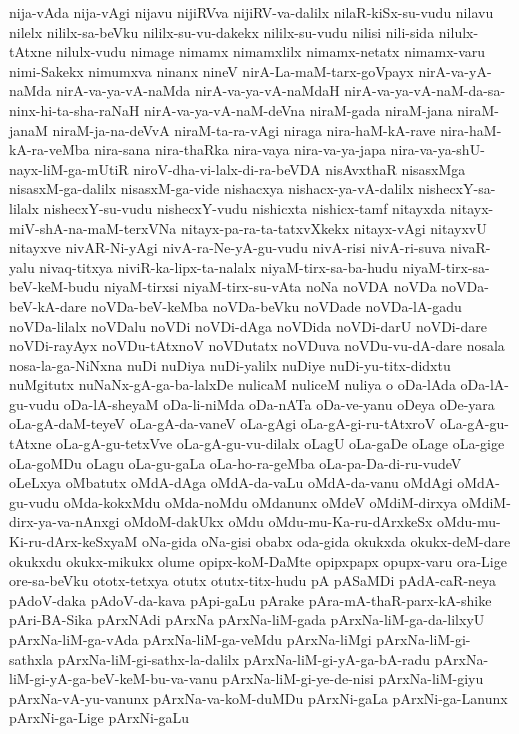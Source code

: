 {nija-vAda
nija-vAgi
nijavu
nijiRVva
nijiRV-va-dalilx
nilaR-kiSx-su-vudu
nilavu
nilelx
nililx-sa-beVku
nililx-su-vu-dakekx
nililx-su-vudu
nilisi
nili-sida
nilulx-tAtxne
nilulx-vudu
nimage
nimamx
nimamxlilx
nimamx-netatx
nimamx-varu
nimi-Sakekx
nimumxva
ninanx
nineV
nirA-La-maM-tarx-goVpayx
nirA-va-yA-naMda
nirA-va-ya-vA-naMda
nirA-va-ya-vA-naMdaH
nirA-va-ya-vA-naM-da-sa-ninx-hi-ta-sha-raNaH
nirA-va-ya-vA-naM-deVna
niraM-gada
niraM-jana
niraM-janaM
niraM-ja-na-deVvA
niraM-ta-ra-vAgi
niraga
nira-haM-kA-rave
nira-haM-kA-ra-veMba
nira-sana
nira-thaRka
nira-vaya
nira-va-ya-japa
nira-va-ya-shU-nayx-liM-ga-mUtiR
niroV-dha-vi-lalx-di-ra-beVDA
nisAvxthaR
nisasxMga
nisasxM-ga-dalilx
nisasxM-ga-vide
nishacxya
nishacx-ya-vA-dalilx
nishecxY-sa-lilalx
nishecxY-su-vudu
nishecxY-vudu
nishicxta
nishicx-tamf
nitayxda
nitayx-miV-shA-na-maM-terxVNa
nitayx-pa-ra-ta-tatxvXkekx
nitayx-vAgi
nitayxvU
nitayxve
nivAR-Ni-yAgi
nivA-ra-Ne-yA-gu-vudu
nivA-risi
nivA-ri-suva
nivaR-yalu
nivaq-titxya
niviR-ka-lipx-ta-nalalx
niyaM-tirx-sa-ba-hudu
niyaM-tirx-sa-beV-keM-budu
niyaM-tirxsi
niyaM-tirx-su-vAta
noNa
noVDA
noVDa
noVDa-beV-kA-dare
noVDa-beV-keMba
noVDa-beVku
noVDade
noVDa-lA-gadu
noVDa-lilalx
noVDalu
noVDi
noVDi-dAga
noVDida
noVDi-darU
noVDi-dare
noVDi-rayAyx
noVDu-tAtxnoV
noVDutatx
noVDuva
noVDu-vu-dA-dare
nosala
nosa-la-ga-NiNxna
nuDi
nuDiya
nuDi-yalilx
nuDiye
nuDi-yu-titx-didxtu
nuMgitutx
nuNaNx-gA-ga-ba-lalxDe
nulicaM
nuliceM
nuliya
o
oDa-lAda
oDa-lA-gu-vudu
oDa-lA-sheyaM
oDa-li-niMda
oDa-nATa
oDa-ve-yanu
oDeya
oDe-yara
oLa-gA-daM-teyeV
oLa-gA-da-vaneV
oLa-gAgi
oLa-gA-gi-ru-tAtxroV
oLa-gA-gu-tAtxne
oLa-gA-gu-tetxVve
oLa-gA-gu-vu-dilalx
oLagU
oLa-gaDe
oLage
oLa-gige
oLa-goMDu
oLagu
oLa-gu-gaLa
oLa-ho-ra-geMba
oLa-pa-Da-di-ru-vudeV
oLeLxya
oMbatutx
oMdA-dAga
oMdA-da-vaLu
oMdA-da-vanu
oMdAgi
oMdA-gu-vudu
oMda-kokxMdu
oMda-noMdu
oMdanunx
oMdeV
oMdiM-dirxya
oMdiM-dirx-ya-va-nAnxgi
oMdoM-dakUkx
oMdu
oMdu-mu-Ka-ru-dArxkeSx
oMdu-mu-Ki-ru-dArx-keSxyaM
oNa-gida
oNa-gisi
obabx
oda-gida
okukxda
okukx-deM-dare
okukxdu
okukx-mikukx
olume
opipx-koM-DaMte
opipxpapx
opupx-varu
ora-Lige
ore-sa-beVku
ototx-tetxya
otutx
otutx-titx-hudu
pA
pASaMDi
pAdA-caR-neya
pAdoV-daka
pAdoV-da-kava
pApi-gaLu
pArake
pAra-mA-thaR-parx-kA-shike
pAri-BA-Sika
pArxNAdi
pArxNa
pArxNa-liM-gada
pArxNa-liM-ga-da-lilxyU
pArxNa-liM-ga-vAda
pArxNa-liM-ga-veMdu
pArxNa-liMgi
pArxNa-liM-gi-sathxla
pArxNa-liM-gi-sathx-la-dalilx
pArxNa-liM-gi-yA-ga-bA-radu
pArxNa-liM-gi-yA-ga-beV-keM-bu-va-vanu
pArxNa-liM-gi-ye-de-nisi
pArxNa-liM-giyu
pArxNa-vA-yu-vanunx
pArxNa-va-koM-duMDu
pArxNi-gaLa
pArxNi-ga-Lanunx
pArxNi-ga-Lige
pArxNi-gaLu
}
